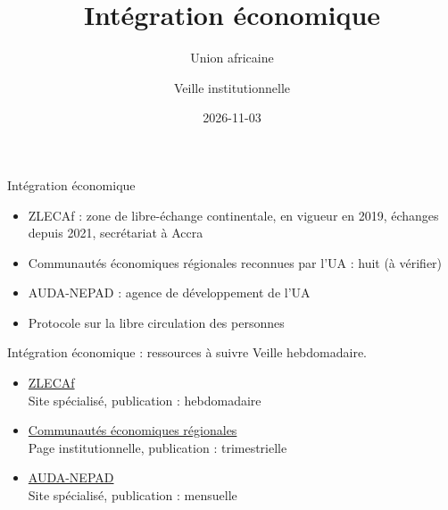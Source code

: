 \documentclass[aspectratio=169,11pt]{beamer}
\title{Intégration économique}
\subtitle{Union africaine}
\author{Veille institutionnelle}
\date{2026-11-03}
\begin{document}
\begin{frame}\titlepage\end{frame}

\begin{frame}{Intégration économique}
\begin{itemize}
\item ZLECAf : zone de libre-échange continentale, en vigueur en 2019, échanges depuis 2021, secrétariat à Accra
\item Communautés économiques régionales reconnues par l'UA : huit (à vérifier)
\item AUDA-NEPAD : agence de développement de l'UA
\item Protocole sur la libre circulation des personnes
\end{itemize}
\end{frame}

\begin{frame}{Intégration économique : ressources à suivre}
\small
Veille hebdomadaire.
\begin{itemize}
\item \href{https://au-afcfta.org}{ZLECAf}\\{\footnotesize Site spécialisé, publication : hebdomadaire}
\item \href{https://au.int/en/recs}{Communautés économiques régionales}\\{\footnotesize Page institutionnelle, publication : trimestrielle}
\item \href{https://www.nepad.org}{AUDA-NEPAD}\\{\footnotesize Site spécialisé, publication : mensuelle}
\end{itemize}
\end{frame}
\end{document}
